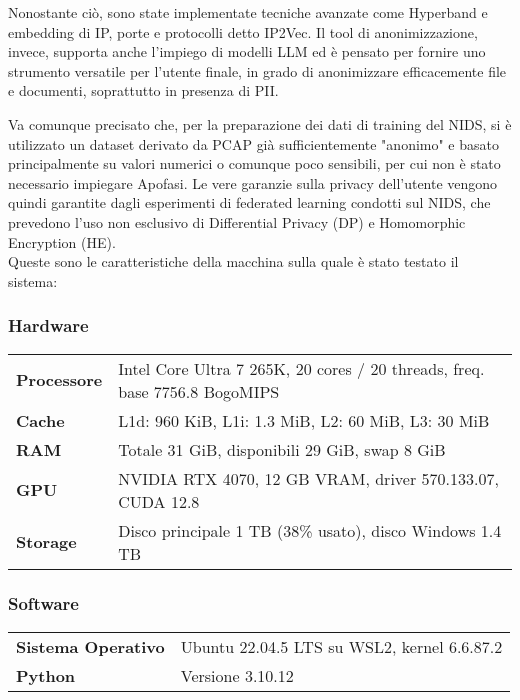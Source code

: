 Nonostante ciò, sono state implementate tecniche avanzate come Hyperband e embedding di IP, porte e protocolli detto IP2Vec. Il tool di anonimizzazione, invece, supporta anche l'impiego di modelli LLM ed è pensato per fornire uno strumento versatile per l'utente finale, in grado di anonimizzare efficacemente file e documenti, soprattutto in presenza di PII.

Va comunque precisato che, per la preparazione dei dati di training del NIDS, si è utilizzato un dataset derivato da PCAP già sufficientemente "anonimo" e basato principalmente su valori numerici o comunque poco sensibili, per cui non è stato necessario impiegare Apofasi. Le vere garanzie sulla privacy dell'utente vengono quindi garantite dagli esperimenti di federated learning condotti sul NIDS, che prevedono l'uso non esclusivo di Differential Privacy (DP) e Homomorphic Encryption (HE).
\\
Queste sono le caratteristiche della macchina sulla quale è stato testato il sistema:
\subsubsection{Hardware}

\begin{table}[h!]
\centering
\begin{tabular}{@{}ll@{}}
\toprule
\textbf{Processore} & Intel Core Ultra 7 265K, 20 cores / 20 threads, freq. base 7756.8 BogoMIPS \\
\textbf{Cache} & L1d: 960 KiB, L1i: 1.3 MiB, L2: 60 MiB, L3: 30 MiB \\
\textbf{RAM} & Totale 31 GiB, disponibili 29 GiB, swap 8 GiB \\
\textbf{GPU} & NVIDIA RTX 4070, 12 GB VRAM, driver 570.133.07, CUDA 12.8 \\
\textbf{Storage} & Disco principale 1 TB (38\% usato), disco Windows 1.4 TB \\
\bottomrule
\end{tabular}
\end{table}

\subsubsection{Software}

\begin{table}[h!]
\centering
\begin{tabular}{@{}ll@{}}
\toprule
\textbf{Sistema Operativo} & Ubuntu 22.04.5 LTS su WSL2, kernel 6.6.87.2 \\
\textbf{Python} & Versione 3.10.12 \\
\bottomrule
\end{tabular}
\end{table}

